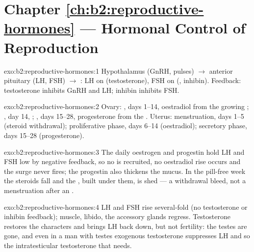 \section*{Chapter \ref{ch:b2:reproductive-hormones} --- Hormonal Control of Reproduction}

\begin{solution}{exo:b2:reproductive-hormones:1}
Hypothalamus (GnRH, pulses) $\to$ anterior pituitary (LH, FSH) $\to$
: LH on  (testosterone), FSH on 
(, inhibin). Feedback: testosterone inhibits GnRH and
LH; inhibin inhibits FSH.
\end{solution}

\begin{solution}{exo:b2:reproductive-hormones:2}
Ovary: , days 1--14, oestradiol from the growing
; , day 14, ; , days 15--28,
progesterone from the . Uterus: menstruation, days 1--5
(steroid withdrawal); proliferative phase, days 6--14 (oestradiol);
secretory phase, days 15--28 (progesterone).
\end{solution}

\begin{solution}{exo:b2:reproductive-hormones:3}
The daily oestrogen and progestin hold LH and FSH low by negative
feedback, so no  is recruited, no oestradiol rise occurs and
the surge never fires; the progestin also thickens the mucus. In the
pill-free week the steroids fall and the , built under
them, is shed --- a withdrawal bleed, not a menstruation after an
.
\end{solution}

\begin{solution}{exo:b2:reproductive-hormones:4}
LH and FSH rise several-fold (no testosterone or inhibin feedback);
muscle, libido, the accessory glands regress. Testosterone restores
the characters and brings LH back down, but not fertility: the
testes are gone, and even in a man with testes exogenous
testosterone suppresses LH and so the intratesticular testosterone
that  needs.
\end{solution}


